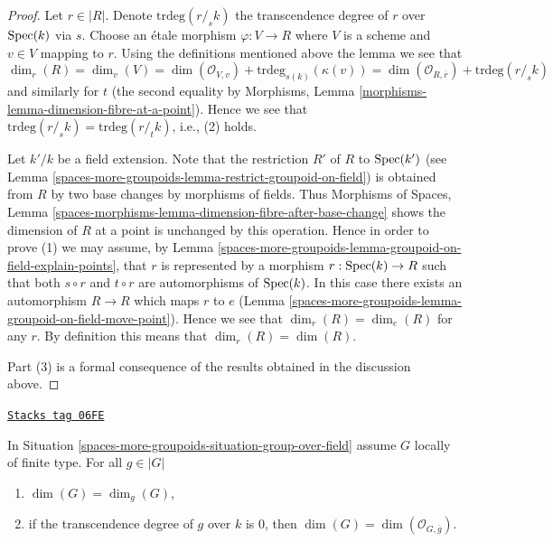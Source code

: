 \begin{proof}
Let $r \in |R|$. Denote $\text{trdeg}(r/_{\!\! s}k)$ the transcendence
degree of $r$ over $\operatorname{Spec}(k)$ via $s$. Choose an \'etale morphism
$\varphi : V \to R$ where $V$ is a scheme and $v \in V$ mapping to $r$.
Using the definitions mentioned above the lemma we see that
$$
\dim_r(R) = \dim_v(V) =
\dim(\mathcal{O}_{V, v}) + \text{trdeg}_{s(k)}(\kappa(v)) =
\dim(\mathcal{O}_{R, \overline{r}}) + \text{trdeg}(r/_{\!\! s}k)
$$
and similarly for $t$ (the second equality by
Morphisms, Lemma \ref{morphisms-lemma-dimension-fibre-at-a-point}).
Hence we see that $\text{trdeg}(r/_{\!\! s}k) = \text{trdeg}(r/_{\!\! t}k)$,
i.e., (2) holds.

\medskip\noindent
Let $k'/k$ be a field extension. Note that the restriction $R'$
of $R$ to $\operatorname{Spec}(k')$ (see
Lemma \ref{spaces-more-groupoids-lemma-restrict-groupoid-on-field})
is obtained from $R$ by two base changes by morphisms of fields. Thus
Morphisms of Spaces,
Lemma \ref{spaces-morphisms-lemma-dimension-fibre-after-base-change}
shows the dimension of $R$ at a point is unchanged by this operation.
Hence in order to prove (1) we may assume, by
Lemma \ref{spaces-more-groupoids-lemma-groupoid-on-field-explain-points},
that $r$ is represented by a morphism $r : \operatorname{Spec}(k) \to R$ such
that both $s \circ r$ and $t \circ r$ are automorphisms of $\operatorname{Spec}(k)$.
In this case there exists an automorphism $R \to R$ which maps $r$ to $e$
(Lemma \ref{spaces-more-groupoids-lemma-groupoid-on-field-move-point}).
Hence we see that $\dim_r(R) = \dim_e(R)$ for any $r$. By definition this
means that $\dim_r(R) = \dim(R)$.

\medskip\noindent
Part (3) is a formal consequence of the results obtained in the discussion
above.
\end{proof}

\begin{lemma}
\label{spaces-more-groupoids-lemma-group-over-field-locally-finite-type-dimension}
\href{https://stacks.math.columbia.edu/tag/06FE}{\texttt{Stacks tag 06FE}}

In
Situation \ref{spaces-more-groupoids-situation-group-over-field}
assume $G$ locally of finite type.
For all $g \in |G|$
\begin{enumerate}
\item $\dim(G) = \dim_g(G)$,
\item if the transcendence degree of $g$ over $k$ is $0$, then
$\dim(G) = \dim(\mathcal{O}_{G, \overline{g}})$.
\end{enumerate}
\end{lemma}

